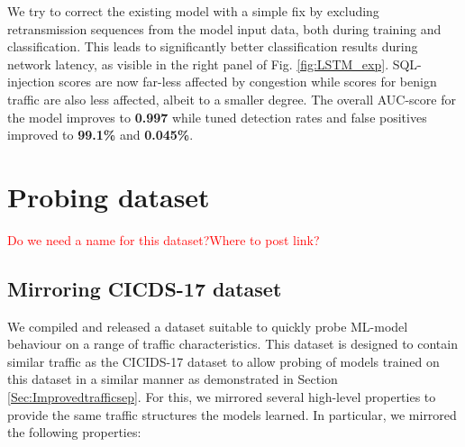 \documentclass[runningheads]{llncs}
\begin{document}
We try to correct the existing model with a simple fix by excluding retransmission sequences from the model input data, both during training and classification. This leads to significantly better classification results during network latency, as visible in the right panel of Fig. \ref{fig:LSTM_exp}. SQL-injection scores are now far-less affected by congestion while scores for benign traffic are also less affected, albeit to a smaller degree.
The overall AUC-score for the model improves to \textbf{0.997} while tuned detection rates and false positives improved to \textbf{99.1\%} and \textbf{0.045\%}.


\section{Probing dataset}\label{Sec:ProbData}
\textcolor{red}{Do we need a name for this dataset?Where to post link?}

\subsection{Mirroring CICDS-17 dataset}

We compiled and released a dataset suitable to quickly probe ML-model behaviour on a range of traffic characteristics. This dataset is designed to contain similar traffic as the CICIDS-17 \cite{sharafaldin2018toward} dataset to allow probing of models trained on this dataset in a similar manner as demonstrated in Section \ref{Sec:Improvedtrafficsep}. 
For this, we mirrored several high-level properties to provide the same traffic structures the models learned. In particular, we mirrored the following properties:
\end{document}
